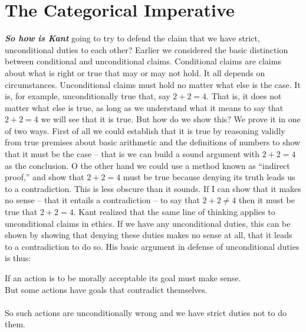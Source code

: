 \documentclass[12pt, openany]{book}
\begin{document}
\hypertarget{the-categorical-imperative}{%
\section{The Categorical Imperative}\label{the-categorical-imperative}}

\textbf{\emph{So how is Kant}} going to try to defend the claim that we have strict, unconditional duties to each other? Earlier we considered the basic distinction between conditional and unconditional claims. Conditional claims are claims about what is right or true that may or may not hold. It all depends on circumstances. Unconditional claims must hold no matter what else is the case. It is, for example, unconditionally true that, say \(2 + 2 = 4\). That is, it does not matter what else is true, as long as we understand what it means to say that \(2 + 2 = 4\) we will see that it is true. But how do we show this? We prove it in one of two ways. First of all we could establish that it is true by reasoning validly from true premises about basic arithmetic and the definitions of numbers to show that it must be the case -- that is we can build a sound argument with \(2 + 2 = 4\) as the conclusion. O the other hand we could use a method known as ``indirect proof,'' and show that \(2 + 2 = 4\) must be true because denying its truth leads us to a contradiction. This is less obscure than it sounds. If I can show that it makes no sense -- that it entails a contradiction -- to say that \(2 +2 \neq 4\) then it must be true that \(2 + 2 = 4\). Kant realized that the same line of thinking applies to unconditional claims in ethics. If we have any unconditional duties, this can be shown by showing that denying these duties makes no sense at all, that it leads to a contradiction to do so. His basic argument in defense of unconditional duties is thus:

\begin{center}

\begin{argument}

If an action is to be morally acceptable its goal must make sense.\\
But some actions have goals that contradict themselves.\\
~\\
So such actions are unconditionally wrong and we have strict duties not to do them.

\end{argument}

\end{center}
\end{document}
